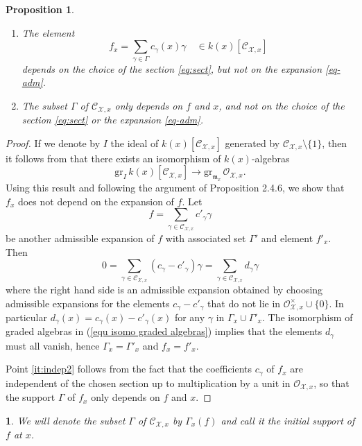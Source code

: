 \documentclass{amsart}%
\numberwithin{equation}{subsection}
\theoremstyle{plain2}
\newtheorem{prop}[equation]{Proposition}
\theoremstyle{definition2}
\theoremstyle{stepstyle}
\theoremstyle{point}
\theoremstyle{subpoint}
\newtheorem{subpoint}[equation]{}%
\newcommand{\spa}[1]{\begin{subpoint}#1\end{subpoint}}           %
\newcommand{\cX}{\ensuremath{\mathscr{X}}}
\newcommand{\caO}{\ensuremath{\mathcal{O}}}
\begin{document}
\begin{prop}\label{prop-init}\item
\begin{enumerate}
\item \label{it:indep1} The element
$$f_x=\sum_{\gamma\in \Gamma}c_\gamma(x) \gamma\quad \in k(x)[\mathcal{C}_{\cX,x}]$$ depends on the choice of the section \eqref{eq:sect}, but not on the expansion \eqref{eq-adm}. \item \label{it:indep2} The subset $\Gamma$ of $\mathcal{C}_{\cX,x}$ only depends on $f$ and $x$, and not on the choice of the section \eqref{eq:sect} or the expansion \eqref{eq-adm}.
\end{enumerate}
\end{prop}
\begin{proof}
If we denote by $I$ the ideal of $k(x)[\mathcal{C}_{\cX,x}]$ generated by $\mathcal{C}_{\cX,x}\setminus \{1\}$, then it follows from \cite{Kato1994a} that there exists an isomorphism of $k(x)$-algebras \begin{equation} \label{equ isomo graded algebras}
\mathrm{gr}_I \,k(x)[\mathcal{C}_{\cX,x}]\to \mathrm{gr}_{\mathfrak{m}_x}\, \mathcal{O}_{\cX,x}.
\end{equation}
Using this result and following the argument of  \cite{MustataNicaise} Proposition 2.4.6, we show that $f_x$ does not depend on the expansion of $f$. Let $$f=\sum_{\gamma \in \mathcal{C}_{\cX,x}}c'_{\gamma}\gamma$$ be another admissible expansion of $f$ with associated set $\Gamma'$ and element $f'_x$. Then $$0=\sum_{\gamma \in \mathcal{C}_{\cX,x}}(c_{\gamma}- c'_\gamma)\gamma =\sum_{\gamma \in \mathcal{C}_{\cX,x}}d_{\gamma}\gamma$$ where the right hand side is an admissible expansion obtained by choosing admissible expansions for the elements $c_\gamma-c'_\gamma$ that do not lie in $\caO_{\cX,x}^\times \cup \{0\}$. In particular $d_\gamma(x)= c_\gamma(x)-c'_\gamma(x)$ for any $\gamma$ in $ \Gamma_x \cup \Gamma'_x$. The isomorphism of graded algebras in (\ref{equ isomo graded algebras}) implies that the elements $d_\gamma$ must all vanish, hence $\Gamma_x = \Gamma'_x$ and $f_x=f'_x$.  

Point \eqref{it:indep2} follows from the fact that the coefficients $c_\gamma$ of $f_x$ are independent of the chosen section up to multiplication by a unit in $\mathcal{O}_{\cX,x}$, so that the support $\Gamma$ of $f_x$ only depends on $f$ and $x$.
\end{proof}

\spa{ We will denote the subset $\Gamma$ of $\mathcal{C}_{\cX,x}$ by $\Gamma_x(f)$ and call it the {\em initial support} of $f$ at $x$.}
\end{document}
